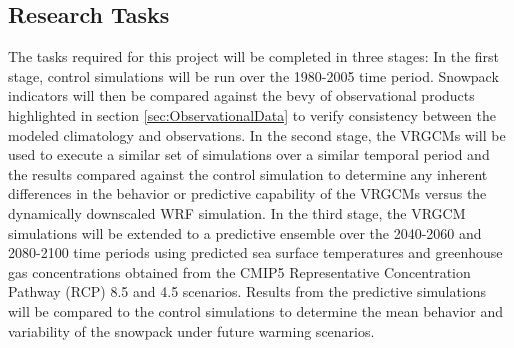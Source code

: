 \documentclass[11pt]{article}
\begin{document}

\subsection{Research Tasks}


The tasks required for this project will be completed in three stages: In the first stage, control simulations will be run over the 1980-2005 time period. Snowpack indicators will then be compared against the bevy of observational products highlighted in section \ref{sec:ObservationalData} to verify consistency between the modeled climatology and observations. In the second stage, the VRGCMs will be used to execute a similar set of simulations over a similar temporal period and the results compared against the control simulation to determine any inherent differences in the behavior or predictive capability of the VRGCMs versus the dynamically downscaled WRF simulation. In the third stage, the VRGCM simulations will be extended to a predictive ensemble over the 2040-2060 and 2080-2100 time periods using predicted sea surface temperatures and greenhouse gas concentrations obtained from the CMIP5 Representative Concentration Pathway (RCP) 8.5 and 4.5 scenarios. Results from the predictive simulations will be compared to the control simulations to determine the mean behavior and variability of the snowpack under future warming scenarios.
\end{document}
